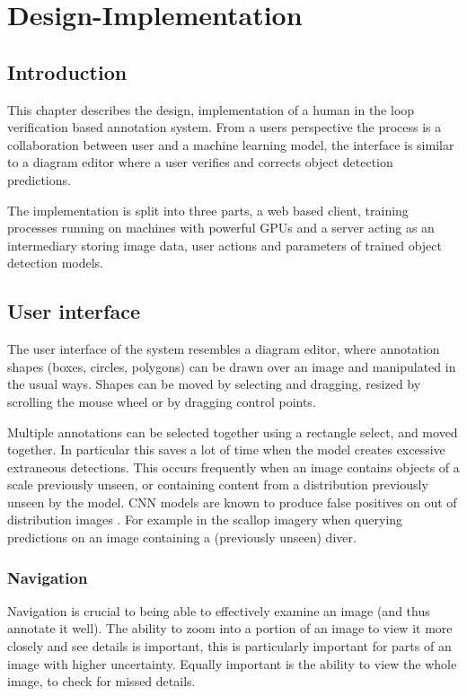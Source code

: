 \chapter{Design-Implementation}
\label{chap:design} 

\section{Introduction}

This chapter describes the design, implementation of a human in the loop verification based annotation system. From a users perspective the process is a collaboration between user and a machine learning model, the interface is similar to a diagram editor where a user verifies and corrects object detection predictions.

The implementation is split into three parts, a web based client, training processes running on machines with powerful \gls{GPU}s and a server acting as an intermediary storing image data, user actions and parameters of trained object detection models.


\section {User interface}

The user interface of the system resembles a diagram editor, where annotation shapes (boxes, circles, polygons) can be drawn over an image and manipulated in the usual ways. Shapes can be moved by selecting and dragging, resized by scrolling the mouse wheel or by dragging control points. 

Multiple annotations can be selected together using a rectangle select, and moved together. In particular this saves a lot of time when the model creates excessive extraneous detections. This occurs frequently when an image contains objects of a scale previously unseen, or containing content from a distribution previously unseen by the model. \gls{CNN} models are known to produce false positives on out of distribution images \cite{todo}. For example in the scallop imagery when querying predictions on an image containing a (previously unseen) diver.

\subsection {Navigation}

Navigation is crucial to being able to effectively examine an image (and thus annotate it well). The ability to zoom into a portion of an image to view it more closely and see details is important, this is particularly important for parts of an image with higher uncertainty. Equally important is the ability to view the whole image, to check for missed details. 

